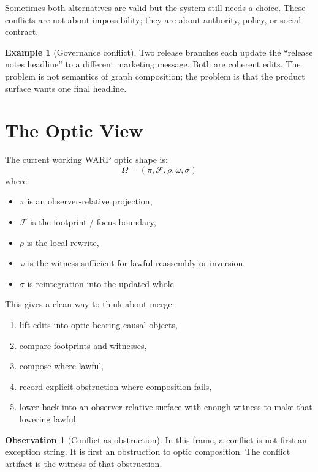 \documentclass[11pt]{article}
\newcommand{\Proj}{\pi}
\theoremstyle{definition}
\newtheorem{observation}{Observation}
\newtheorem{example}{Example}
\begin{document}
Sometimes both alternatives are valid but the system still needs a choice.
These conflicts are not about impossibility; they are about authority, policy,
or social contract.

\begin{example}[Governance conflict]
Two release branches each update the ``release notes headline'' to a different
marketing message. Both are coherent edits. The problem is not semantics of
graph composition; the problem is that the product surface wants one final
headline.
\end{example}

\section{The Optic View}

The current working WARP optic shape is:
\[
\Omega = (\Proj,\mathcal{F},\rho,\omega,\sigma)
\]
where:
\begin{itemize}[leftmargin=2em]
\item $\Proj$ is an observer-relative projection,
\item $\mathcal{F}$ is the footprint / focus boundary,
\item $\rho$ is the local rewrite,
\item $\omega$ is the witness sufficient for lawful reassembly or inversion,
\item $\sigma$ is reintegration into the updated whole.
\end{itemize}

This gives a clean way to think about merge:
\begin{enumerate}[leftmargin=2em]
\item lift edits into optic-bearing causal objects,
\item compare footprints and witnesses,
\item compose where lawful,
\item record explicit obstruction where composition fails,
\item lower back into an observer-relative surface with enough witness to make
  that lowering lawful.
\end{enumerate}

\begin{observation}[Conflict as obstruction]
In this frame, a conflict is not first an exception string. It is first an
obstruction to optic composition. The conflict artifact is the witness of that
obstruction.
\end{observation}
\end{document}
